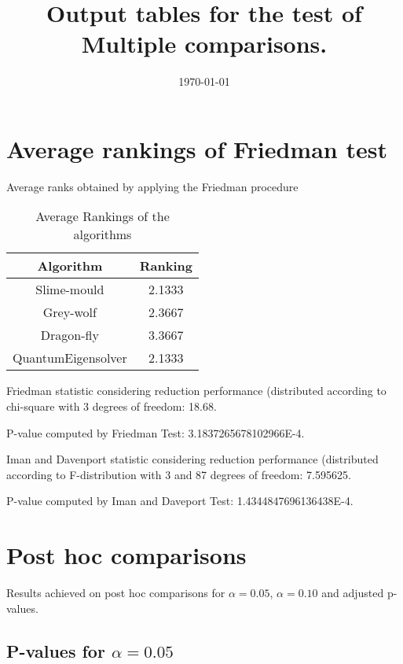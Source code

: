 \documentclass[a4paper,10pt]{article}
\title{Output tables for the test of Multiple comparisons.}
\author{}
\date{\today}
\begin{document}
\begin{landscape}
\pagestyle{empty}
\maketitle
\thispagestyle{empty}
\section{Average rankings of Friedman test}



Average ranks obtained by applying the Friedman procedure

\begin{table}[!htp]
\centering
\begin{tabular}{|c|c|}\hline
Algorithm&Ranking\\\hline
Slime-mould & 2.1333\\
Grey-wolf & 2.3667\\
Dragon-fly & 3.3667\\
QuantumEigensolver & 2.1333\\
\hline
\end{tabular}
\caption{Average Rankings of the algorithms}
\end{table}

Friedman statistic considering reduction performance (distributed according to chi-square with 3 degrees of freedom: 18.68.

P-value computed by Friedman Test: 3.1837265678102966E-4.\newline

Iman and Davenport statistic considering reduction performance (distributed according to F-distribution with 3 and 87 degrees of freedom: 7.595625.

P-value computed by Iman and Daveport Test: 1.4344847696136438E-4.\newline



\pagebreak

\section{Post hoc comparisons}

Results achieved on post hoc comparisons for $\alpha = 0.05$, $\alpha = 0.10$ and adjusted p-values.

\subsection{P-values for $\alpha=0.05$}


\end{landscape}
\end{document}
